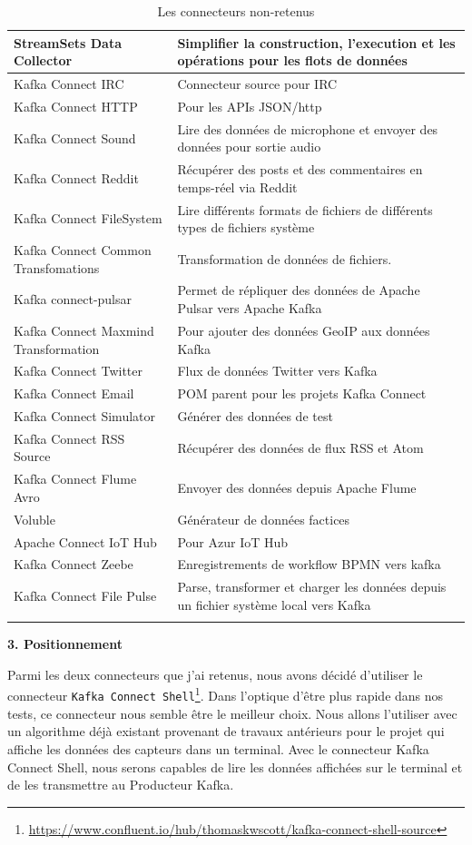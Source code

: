 \documentclass[11pt]{article}
\begin{document}
\begin{longtable}{|p{7.5cm}|p{7.5cm}|}
				StreamSets Data Collector & Simplifier la construction, l’execution et les opérations pour les flots de données\\\hline
				Kafka Connect IRC & Connecteur source pour IRC\\\hline
				Kafka Connect HTTP & Pour les APIs JSON/http\\\hline
				Kafka Connect Sound & Lire des données de microphone et envoyer des données pour sortie audio\\\hline
				Kafka Connect Reddit & Récupérer des posts et des commentaires en temps-réel via Reddit\\\hline
				Kafka Connect FileSystem & Lire différents formats de fichiers de différents types de fichiers système\\\hline
				Kafka Connect Common Transfomations & Transformation de données de fichiers.\\\hline
				Kafka connect-pulsar & Permet de répliquer des données de Apache Pulsar vers Apache Kafka\\\hline
				Kafka Connect Maxmind Transformation & Pour ajouter des données GeoIP aux données Kafka\\\hline
				Kafka Connect Twitter & Flux de données Twitter vers Kafka\\\hline
				Kafka Connect Email & POM parent pour les projets Kafka Connect\\\hline
				Kafka Connect Simulator & Générer des données de test\\\hline
				Kafka Connect RSS Source & Récupérer des données de flux RSS et Atom\\\hline
				Kafka Connect Flume Avro & Envoyer des données depuis Apache Flume\\\hline
				Voluble & Générateur de données factices\\\hline
				Apache Connect IoT Hub & Pour Azur IoT Hub\\\hline
				Kafka Connect Zeebe	& Enregistrements de workflow BPMN vers kafka\\\hline
				Kafka Connect File Pulse & Parse, transformer et charger les données  depuis un fichier système local vers Kafka\\\hline
				\caption{Les connecteurs non-retenus}
				\label{tab:connecteursnon}
			\end{longtable}\par
			\textbf{3. Positionnement}\par
			Parmi les deux connecteurs que j'ai retenus, nous avons décidé d'utiliser le connecteur \texttt{Kafka Connect Shell}\footnote{\href{https://www.confluent.io/hub/thomaskwscott/kafka-connect-shell-source}{https://www.confluent.io/hub/thomaskwscott/kafka-connect-shell-source}}.
			Dans l'optique d'être plus rapide dans nos tests, ce connecteur nous semble être le meilleur choix.
			Nous allons l'utiliser avec un algorithme déjà existant provenant de travaux antérieurs pour le projet qui affiche les données des capteurs dans un terminal.
			Avec le connecteur Kafka Connect Shell, nous serons capables de lire les données affichées sur le terminal et de les transmettre au Producteur Kafka.
\end{document}
